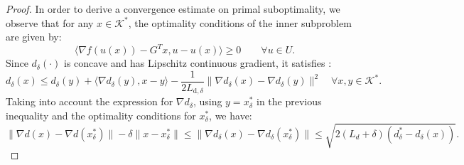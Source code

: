\documentclass{gOMS2e}
\theoremstyle{plain}
\theoremstyle{definition}
\theoremstyle{remark}
\providecommand{\norm}[1]{\lVert#1\rVert}
\begin{document}
\begin{proof}
\noindent In order to derive a convergence estimate  on  primal
suboptimality, we observe that  for any $x \in \mathcal{K}^*$, the
optimality conditions of the inner subproblem are given by:
\begin{equation}\label{optcond_inner}
 \langle \nabla f(u(x))  - G^Tx, u  - u(x)\rangle \ge 0 \qquad \forall u \in U.
\end{equation}
Since $d_{\delta}(\cdot)$ is concave and has Lipschitz continuous
gradient, it satisfies \cite{Nes:04}:
\begin{equation*}
 d_{\delta}(x) \le d_{\delta}(y) + \langle \nabla d_{\delta}(y), x - y\rangle
  - \frac{1}{2L_{\text{d},\delta}}\norm{\nabla d_{\delta}(x) - \nabla d_{\delta}(y)}^2
 \quad \forall x,y \in {\mathcal{K}}^*.
\end{equation*}
Taking into account the expression for $\nabla d_{\delta}$, using $y
= x^*_{\delta}$ in the previous inequality and the optimality
conditions for $x^*_{\delta}$, we have:
\begin{equation}\label{diff_grad}
 \norm{\nabla d(x) - \nabla d(x^*_{\delta})} - \delta \norm{x-x^*_{\delta}} \le
 \norm{\nabla d_{\delta}(x) - \nabla d_{\delta}(x^*_{\delta})}
 \le \sqrt{2(L_{d}+\delta)(d^*_{\delta} - d_{\delta}(x))}.
\end{equation}


\end{proof}
\end{document}

